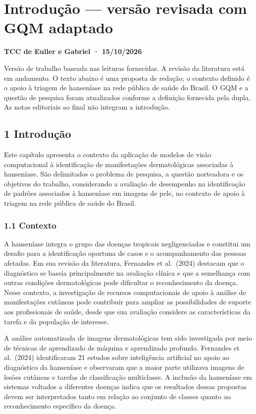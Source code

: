 \documentclass[
]{article}
\author{}
\date{}
\begin{document}
\section{Introdução --- versão revisada com GQM
adaptado}\label{introduuxe7uxe3o-versuxe3o-revisada-com-gqm-adaptado}

\textbf{TCC de Euller e Gabriel · 15/10/2026}

Versão de trabalho baseada nas leituras fornecidas. A revisão da
literatura está em andamento. O texto abaixo é uma proposta de redação;
o contexto definido é o apoio à triagem de hanseníase na rede pública de
saúde do Brasil. O GQM e a questão de pesquisa foram atualizados
conforme a definição fornecida pela dupla. As notas editoriais ao final
não integram a introdução.

\subsection{1 Introdução}\label{introduuxe7uxe3o}

Este capítulo apresenta o contexto da aplicação de modelos de visão
computacional à identificação de manifestações dermatológicas associadas
à hanseníase. São delimitados o problema de pesquisa, a questão
norteadora e os objetivos do trabalho, considerando a avaliação de
desempenho na identificação de padrões associados à hanseníase em
imagens de pele, no contexto de apoio à triagem na rede pública de saúde
do Brasil.

\subsubsection{1.1 Contexto}\label{contexto}

A hanseníase integra o grupo das doenças tropicais negligenciadas e
constitui um desafio para a identificação oportuna de casos e o
acompanhamento das pessoas afetadas. Em sua revisão da literatura,
Fernandes et al.~(2024) destacam que o diagnóstico se baseia
principalmente na avaliação clínica e que a semelhança com outras
condições dermatológicas pode dificultar o reconhecimento da doença.
Nesse contexto, a investigação de recursos computacionais de apoio à
análise de manifestações cutâneas pode contribuir para ampliar as
possibilidades de suporte aos profissionais de saúde, desde que sua
avaliação considere as características da tarefa e da população de
interesse.

A análise automatizada de imagens dermatológicas tem sido investigada
por meio de técnicas de aprendizado de máquina e aprendizado profundo.
Fernandes et al.~(2024) identificaram 21 estudos sobre inteligência
artificial no apoio ao diagnóstico da hanseníase e observaram que a
maior parte utilizava imagens de lesões cutâneas e tarefas de
classificação multiclasse. A inclusão da hanseníase em sistemas voltados
a diferentes doenças indica que os resultados dessas propostas devem ser
interpretados tanto em relação ao conjunto de classes quanto ao
reconhecimento específico da doença.
\end{document}
